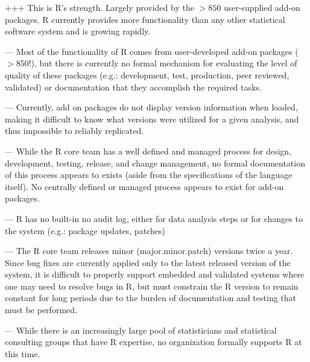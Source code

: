 \documentclass{asaproc}
\begin{document}
\begin{description}

\item +++ This is \textsc{R}'s strength. Largely provided by
  the $>850$ user-supplied add-on packages.  \textsc{R} currently provides more
  functionality than any other statistical software system and is
  growing rapidly.

\item --- Most of the functionality of \textsc{R} comes from
  user-developed add-on packages ($>850$!), but there is currently no formal
  mechanism for evaluating the level of quality of these packages (e.g.:
  development, test, production, peer reviewed, validated) or
  documentation that they accomplish the required tasks.
  
\item --- Currently, add on packages do not display
  version information when loaded, making it difficult to know what
  versions were utilized for a given analysis, and thus impossible to
  reliably replicated.

\item --- While the \textsc{R} core team has a well defined and
  managed process for design, development, testing, release, and
  change management, no formal documentation of this process appears
  to exists (aside from the specifications of the language itself).
  No centrally defined or managed process appears to exist for add-on
  packages.

\item --- \textsc{R} has no built-in no audit log, either for data
  analysis steps or for changes to the system (e.g.: package updates,
  patches)
  
\item --- The \textsc{R} core team releases minor (major.minor.patch)
  versions twice a year.  Since bug fixes are currently applied only
  to the latest released version of the system, it is difficult to
  properly support embedded and validated systems where one may need
  to resolve bugs in \textsc{R}, but must constrain the \textsc{R}
  version to remain constant for long periods due to the burden of
  documentation and testing that must be performed.

\item --- While there is an increasingly large pool of
  statisticians and statistical consulting groups that have \textsc{R}
  expertise, no organization formally supports \textsc{R} at this time.

\end{description}
\end{document}
